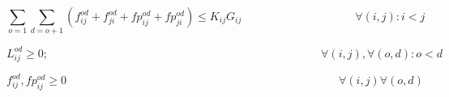 \begin{equation}
\sum_{o=1} \sum_{d=o+1} \left( f_{ij}^{od} + f_{ji}^{od} + fp_{ij}^{od} + fp_{ji}^{od} \right) \leq K_{ij} G_{ij}
\qquad \qquad \qquad \qquad \qquad
\forall (i,j) : i < j
\label{ILPTranslucp9}
\end{equation}

\begin{equation}
L_{ij}^{od} \geq 0;
\qquad \qquad \qquad \qquad \qquad \qquad \qquad \qquad \qquad \qquad \qquad \qquad
\forall (i,j) , \forall (o,d) : o < d
\label{ILPTranslucp5}
\end{equation}

\begin{equation}
f_{ij}^{od}, fp_{ij}^{od} \geq 0
\qquad \qquad \qquad \qquad \qquad \qquad \qquad \qquad \qquad \qquad \qquad \qquad
\forall (i,j) \forall (o,d)
\label{ILPTranslucp10}
\end{equation}	

